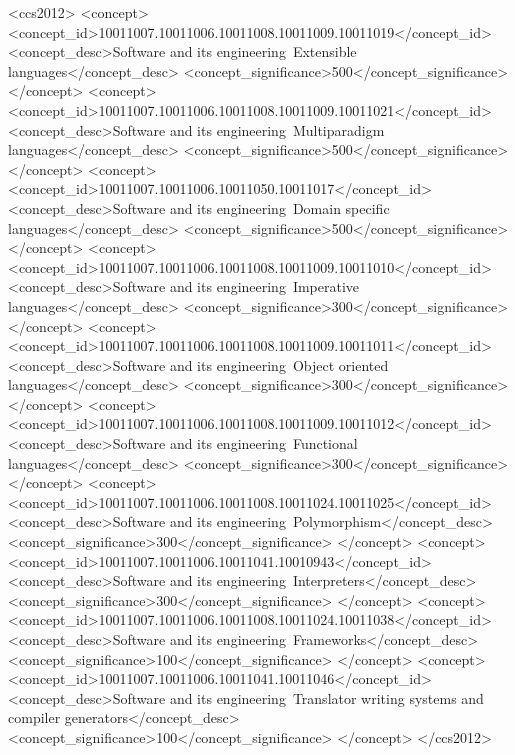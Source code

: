 \documentclass[acmsmall,10pt,review,screen,anonymous]{acmart}
\begin{document}
%
%
\begin{CCSXML}
<ccs2012>
<concept>
<concept_id>10011007.10011006.10011008.10011009.10011019</concept_id>
<concept_desc>Software and its engineering~Extensible languages</concept_desc>
<concept_significance>500</concept_significance>
</concept>
<concept>
<concept_id>10011007.10011006.10011008.10011009.10011021</concept_id>
<concept_desc>Software and its engineering~Multiparadigm languages</concept_desc>
<concept_significance>500</concept_significance>
</concept>
<concept>
<concept_id>10011007.10011006.10011050.10011017</concept_id>
<concept_desc>Software and its engineering~Domain specific languages</concept_desc>
<concept_significance>500</concept_significance>
</concept>
<concept>
<concept_id>10011007.10011006.10011008.10011009.10011010</concept_id>
<concept_desc>Software and its engineering~Imperative languages</concept_desc>
<concept_significance>300</concept_significance>
</concept>
<concept>
<concept_id>10011007.10011006.10011008.10011009.10011011</concept_id>
<concept_desc>Software and its engineering~Object oriented languages</concept_desc>
<concept_significance>300</concept_significance>
</concept>
<concept>
<concept_id>10011007.10011006.10011008.10011009.10011012</concept_id>
<concept_desc>Software and its engineering~Functional languages</concept_desc>
<concept_significance>300</concept_significance>
</concept>
<concept>
<concept_id>10011007.10011006.10011008.10011024.10011025</concept_id>
<concept_desc>Software and its engineering~Polymorphism</concept_desc>
<concept_significance>300</concept_significance>
</concept>
<concept>
<concept_id>10011007.10011006.10011041.10010943</concept_id>
<concept_desc>Software and its engineering~Interpreters</concept_desc>
<concept_significance>300</concept_significance>
</concept>
<concept>
<concept_id>10011007.10011006.10011008.10011024.10011038</concept_id>
<concept_desc>Software and its engineering~Frameworks</concept_desc>
<concept_significance>100</concept_significance>
</concept>
<concept>
<concept_id>10011007.10011006.10011041.10011046</concept_id>
<concept_desc>Software and its engineering~Translator writing systems and compiler generators</concept_desc>
<concept_significance>100</concept_significance>
</concept>
</ccs2012>
\end{CCSXML}

%
%
\end{document}
